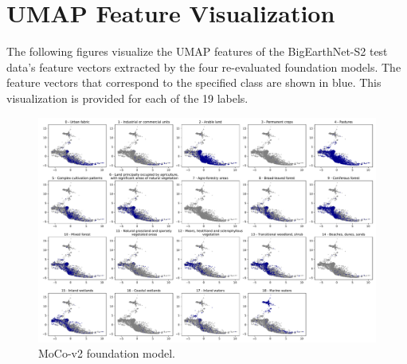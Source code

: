 
\clearpage

\maketitlesupplementary

\section*{UMAP Feature Visualization} 

\vspace{10pt}
\begin{minipage}{\textwidth}
    The following figures visualize the UMAP features of the BigEarthNet-S2 test data's feature vectors extracted by the four re-evaluated foundation models.  The feature vectors that correspond to the specified class are shown in blue. This visualization is provided for each of the 19 labels. \\
\end{minipage}

\begin{figure}[htbp]
  \centering
   \begin{minipage}{\textwidth}
   \includegraphics[width=\linewidth]{figures/all_labels_moco.pdf}
   \caption{MoCo-v2 foundation model.}
   \end{minipage}
\end{figure}

